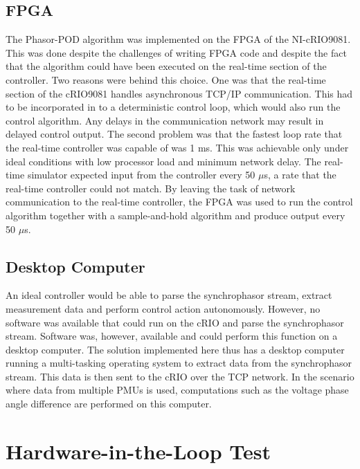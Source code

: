 \documentclass[conference]{IEEEtran}
\begin{document}
\subsection{FPGA} The Phasor-POD algorithm was implemented on the FPGA of the NI-cRIO9081. This was done despite the challenges of writing FPGA code and despite the fact that the algorithm could have been executed on the real-time section of the controller. Two reasons were behind this choice. One was that the real-time section of the cRIO9081 handles asynchronous TCP/IP communication. This had to be incorporated in to a deterministic control loop, which would also run the control algorithm. Any delays in the communication network may result in delayed control output. The second problem was that the fastest loop rate that the real-time controller was capable of was 1 ms. This was achievable only under ideal conditions with low processor load and minimum network delay. The real-time simulator expected input from the controller every 50 $\mu$s, a rate that the real-time controller could not match. By leaving the task of network communication to the real-time controller, the FPGA was used to run the control algorithm together with a sample-and-hold algorithm and produce output every 50 $\mu$s.

\subsection{Desktop Computer} An ideal controller would be able to parse the synchrophasor stream, extract measurement data and perform control action autonomously. However, no software was available that could run on the cRIO and parse the synchrophasor stream. Software \cite{SDK} was, however, available and could perform this function on a desktop computer. The solution implemented here thus has a desktop computer running a multi-tasking operating system to extract data from the synchrophasor stream. This data is then sent to the cRIO over the TCP network. In the scenario where data from multiple PMUs is used, computations such as the voltage phase angle difference are performed on this computer.

\section{Hardware-in-the-Loop Test} \label{HILtest}
\end{document}
